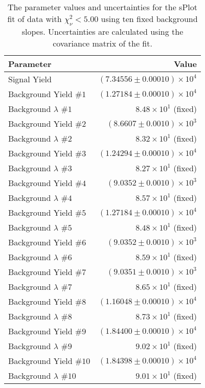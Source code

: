 
\begin{table}[ht]
    \begin{center}
        \begin{tabular}{lr}\toprule
            Parameter & Value \\\midrule
            Signal Yield & $(7.34556 \pm 0.00010) \times 10^{4}$ \\
            Background Yield $\#1$ & $(1.27184 \pm 0.00010) \times 10^{4}$ \\
            Background $\lambda$ $\#1$ & $8.48 \times 10^{1}$ (fixed) \\
            Background Yield $\#2$ & $(8.6607 \pm 0.0010) \times 10^{3}$ \\
            Background $\lambda$ $\#2$ & $8.32 \times 10^{1}$ (fixed) \\
            Background Yield $\#3$ & $(1.24294 \pm 0.00010) \times 10^{4}$ \\
            Background $\lambda$ $\#3$ & $8.27 \times 10^{1}$ (fixed) \\
            Background Yield $\#4$ & $(9.0352 \pm 0.0010) \times 10^{3}$ \\
            Background $\lambda$ $\#4$ & $8.57 \times 10^{1}$ (fixed) \\
            Background Yield $\#5$ & $(1.27184 \pm 0.00010) \times 10^{4}$ \\
            Background $\lambda$ $\#5$ & $8.48 \times 10^{1}$ (fixed) \\
            Background Yield $\#6$ & $(9.0352 \pm 0.0010) \times 10^{3}$ \\
            Background $\lambda$ $\#6$ & $8.59 \times 10^{1}$ (fixed) \\
            Background Yield $\#7$ & $(9.0351 \pm 0.0010) \times 10^{3}$ \\
            Background $\lambda$ $\#7$ & $8.65 \times 10^{1}$ (fixed) \\
            Background Yield $\#8$ & $(1.16048 \pm 0.00010) \times 10^{4}$ \\
            Background $\lambda$ $\#8$ & $8.73 \times 10^{1}$ (fixed) \\
            Background Yield $\#9$ & $(1.84400 \pm 0.00010) \times 10^{4}$ \\
            Background $\lambda$ $\#9$ & $9.02 \times 10^{1}$ (fixed) \\
            Background Yield $\#10$ & $(1.84398 \pm 0.00010) \times 10^{4}$ \\
            Background $\lambda$ $\#10$ & $9.01 \times 10^{1}$ (fixed) \\\bottomrule
        \end{tabular}
        \caption{The parameter values and uncertainties for the sPlot fit of data with $\chi^2_\nu < 5.00$ using ten fixed background slopes. Uncertainties are calculated using the covariance matrix of the fit.}\label{tab:splot-fit-results-chisqdof-5.00-fixed-10}
    \end{center}
\end{table}
